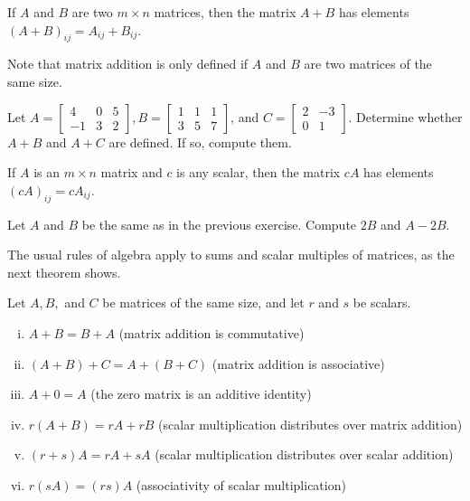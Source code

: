 \documentclass[12pt,letterpaper,reqno]{article}
\numberwithin{equation}{section}
\begin{document}
\begin{defn}
	If $A$ and $B$ are two $m \times n$ matrices, then the matrix $A+B$ has elements $(A+B)_{ij}=A_{ij}+B_{ij}$.
\end{defn}
Note that matrix addition is only defined if $A$ and $B$ are two matrices of the same size.
\begin{exercise}
	Let $A=\begin{bmatrix}
	4&0&5 \\ -1&3&2
\end{bmatrix}, B=\begin{bmatrix}
	1&1&1\\3&5&7
\end{bmatrix}$, and $C=\begin{bmatrix}
	2&-3 \\ 0&1
\end{bmatrix}$. Determine whether $A+B$ and $A+C$ are defined. If so, compute them.
\end{exercise}


\begin{defn}
	If $A$ is an $m \times n$ matrix and $c$ is any scalar, then the matrix $cA$ has elements $(cA)_{ij}=cA_{ij}$.
\end{defn}

\begin{exercise}
Let $A$ and $B$ be the same as in the previous exercise. Compute $2B$ and $A-2B$.	
\end{exercise}

The usual rules of algebra apply to sums and scalar multiples of matrices, as the next theorem shows.

\begin{thm}
Let $A,B,$ and $C$ be matrices of the same size, and let $r$ and $s$ be scalars.
	\begin{enumerate}[(i)]
		\item $A+B=B+A$ (matrix addition is commutative)
		\item $(A+B)+C=A+(B+C)$ (matrix addition is associative)
		\item $A+0=A$ (the zero matrix is an additive identity)
		\item $r(A+B)=rA+rB$ (scalar multiplication distributes over matrix addition)
		\item $(r+s)A=rA+sA$ (scalar multiplication distributes over scalar addition)
		\item $r(sA)=(rs)A$ (associativity of scalar multiplication)
	\end{enumerate}
\end{thm}
\end{document}
